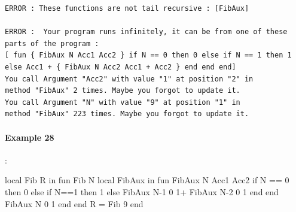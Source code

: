 \documentclass[11pt,a4paper,twoside,openright]{report}
\begin{document}
\begin{lstlisting}
ERROR : These functions are not tail recursive : [FibAux]

ERROR :  Your program runs infinitely, it can be from one of these parts of the program : 
[ fun { FibAux N Acc1 Acc2 } if N == 0 then 0 else if N == 1 then 1 
else Acc1 + { FibAux N Acc2 Acc1 + Acc2 } end end end]
You call Argument "Acc2" with value "1" at position "2" in 
method "FibAux" 2 times. Maybe you forgot to update it.
You call Argument "N" with value "9" at position "1" in 
method "FibAux" 223 times. Maybe you forgot to update it.
\end{lstlisting}
\newpage
\paragraph{Example 28}:

\begin{OZ}
local Fib R in
    fun {Fib N}
        local FibAux in
            fun {FibAux N Acc1 Acc2}
				   if N == 0 then 0
				   else 	if N==1 then 1
				   else  {FibAux N-1 0 1}+ {FibAux N-2 0 1}
				   end	
			end
        	 {FibAux N 0 1}
		end
    	end
	R = {Fib 9}
end
\end{OZ}
\end{document}
